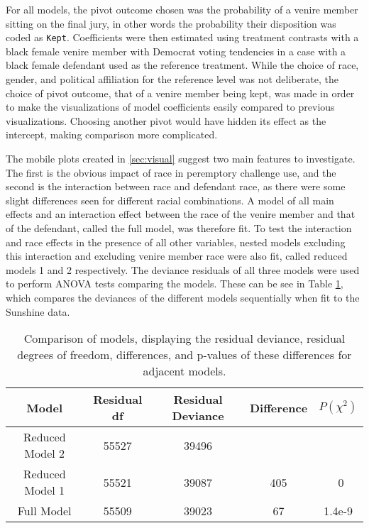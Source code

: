 For all models, the pivot outcome chosen was the probability of a
venire member sitting on the final jury, in other words the probability their disposition was coded as \texttt{Kept}. Coefficients were
then estimated using treatment contrasts with a black female venire member with Democrat voting tendencies in a case with a black female
defendant used as the reference treatment. While the choice of race, gender, and political affiliation for the reference level was not deliberate, the choice of pivot outcome, that of a venire member being kept, was made in order to make the visualizations of model coefficients easily compared to previous visualizations. Choosing another pivot would have hidden its effect as the intercept, making comparison more complicated.

The mobile plots created in \ref{sec:visual} suggest two main features to investigate. The first is the obvious impact of race in peremptory challenge use, and the second is the interaction between race and
defendant race, as there were some slight differences seen for different racial combinations. A model of all main effects and an interaction effect between the race of the venire member and that of the defendant, called the full model, was therefore fit. To test the interaction and race effects in the presence of all other variables, nested models excluding this interaction and excluding venire member race were also fit, called reduced models 1 and 2 respectively. The deviance residuals of all three models were used to perform ANOVA tests comparing the models. These can be see in Table \ref{tab:modcomp}, which compares the deviances of the different models sequentially when fit to the Sunshine data.

\begin{table}[h!]
  \centering
  \caption[Nested ANOVA Table Demonstrating the Importance of
  Race]{\footnotesize Comparison of models, displaying the residual deviance, residual degrees of freedom, differences, and p-values of these
    differences for adjacent models.}
  \label{tab:modcomp}
  \begin{tabular}{|c|c|c|c|c|} \hline
    Model & Residual df & Residual Deviance & Difference & $P(\chi^2)$ \\ \hline
    Reduced Model 2 & 55527 & 39496 &  &  \\
    Reduced Model 1 & 55521 & 39087 & 405 & ~0 \\
    Full Model & 55509 & 39023 & 67 & 1.4e-9 \\ \hline
  \end{tabular}
\end{table}

